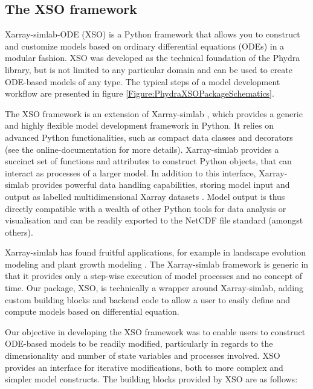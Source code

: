 \documentclass[journal abbreviation, manuscript]{copernicus}
\begin{document}
\subsection{The XSO framework} \label{Section:XSOFramework}


Xarray-simlab-ODE (XSO) is a Python framework that allows you to construct and customize models based on ordinary differential equations (ODEs) in a modular fashion. XSO was developed as the technical foundation of the Phydra library, but is not limited to any particular domain and can be used to create ODE-based models of any type. The typical steps of a model development workflow are presented in figure \ref{Figure:PhydraXSOPackageSchematics}.

The XSO framework is an extension of Xarray-simlab \citep{Bovy2018Xarray-simlab:Interactively, Bovy2021Benbovy/xarray-simlab:0.5.0}, which provides a generic and highly flexible model development framework in Python. It relies on advanced Python functionalities, such as compact data classes and decorators (see the online-documentation for more details). Xarray-simlab provides a succinct set of functions and attributes to construct Python objects, that can interact as processes of a larger model. In addition to this interface, Xarray-simlab provides powerful data handling capabilities, storing model input and output as labelled multidimensional Xarray datasets \citep{Hoyer2017Xarray:Python}. Model output is thus directly compatible with a wealth of other Python tools for data analysis or visualisation and can be readily exported to the NetCDF file standard (amongst others).

Xarray-simlab has found fruitful applications, for example in landscape evolution modeling \citep{Bovy2021Fastscape-lem/fastscape:V0.1.0beta3} and plant growth modeling \citep{Vaillant2022TowardsDevelopment}. The Xarray-simlab framework is generic in that it provides only a step-wise execution of model processes and no concept of time. Our package, XSO, is technically a wrapper around Xarray-simlab, adding custom building blocks and backend code to allow a user to easily define and compute models based on differential equation.

Our objective in developing the XSO framework was to enable users to construct ODE-based models to be readily modified, particularly in regards to the dimensionality and number of state variables and processes involved. XSO provides an interface for iterative modifications, both to more complex and simpler model constructs. The building blocks provided by XSO are as follows:
\end{document}
